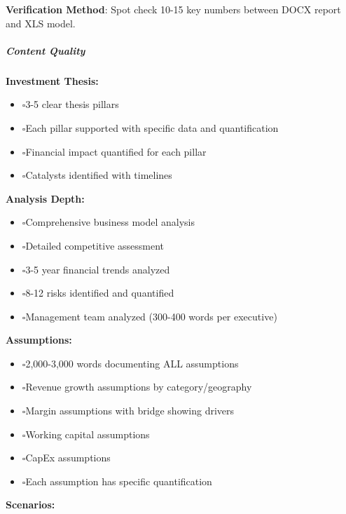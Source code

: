 \documentclass[11pt]{article}
\newcommand{\UncheckedBox}{$\square$}
\begin{document}
\textbf{Verification Method}: Spot check 10-15 key numbers between DOCX report and XLS model.


\subparagraph{Content Quality}\mbox{}\par

\textbf{Investment Thesis:}

\begin{itemize}[leftmargin=*,itemsep=2pt,topsep=2pt]
\item {} \UncheckedBox 3-5 clear thesis pillars
\item {} \UncheckedBox Each pillar supported with specific data and quantification
\item {} \UncheckedBox Financial impact quantified for each pillar
\item {} \UncheckedBox Catalysts identified with timelines
\end{itemize}

\textbf{Analysis Depth:}

\begin{itemize}[leftmargin=*,itemsep=2pt,topsep=2pt]
\item {} \UncheckedBox Comprehensive business model analysis
\item {} \UncheckedBox Detailed competitive assessment
\item {} \UncheckedBox 3-5 year financial trends analyzed
\item {} \UncheckedBox 8-12 risks identified and quantified
\item {} \UncheckedBox Management team analyzed (300-400 words per executive)
\end{itemize}

\textbf{Assumptions:}

\begin{itemize}[leftmargin=*,itemsep=2pt,topsep=2pt]
\item {} \UncheckedBox 2,000-3,000 words documenting ALL assumptions
\item {} \UncheckedBox Revenue growth assumptions by category/geography
\item {} \UncheckedBox Margin assumptions with bridge showing drivers
\item {} \UncheckedBox Working capital assumptions
\item {} \UncheckedBox CapEx assumptions
\item {} \UncheckedBox Each assumption has specific quantification
\end{itemize}

\textbf{Scenarios:}
\end{document}
